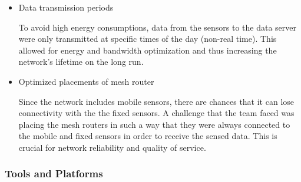 \begin{itemize}
\item Data transmission periods

To avoid high energy consumptions, data from the sensors to the data server were only transmitted at specific times of the day (non-real time). This allowed for energy and bandwidth optimization and thus increasing the network's lifetime on the long run.

\item Optimized placements of mesh router 

Since the network includes mobile sensors, there are chances that it can lose connectivity with the the fixed sensors. A challenge that the team faced was placing the mesh routers in such a way that they were always connected to the mobile and fixed sensors in order to receive the sensed data. This is crucial for network reliability and quality of service.
\end{itemize}


\subsubsection{Tools and Platforms}

